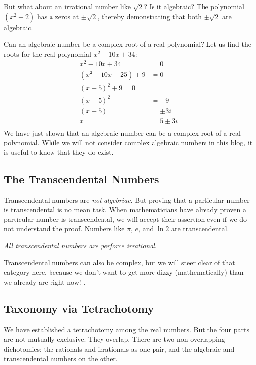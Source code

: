 \documentclass[
  a4paper,
]{article}
\begin{document}
But what about an irrational number like \(\sqrt{2}\)? Is it algebraic?
The polynomial \((x^2 - 2)\) has a zeros at \(\pm\sqrt{2}\), thereby
demonstrating that both \(\pm\sqrt{2}\) are algebraic.

Can an algebraic number be a complex root of a real polynomial? Let us
find the roots for the real polynomial \(x^2 - 10x +34\): \[
\begin{aligned}
x^2 - 10x + 34 &= 0\\
(x^2 -10x + 25) + 9 &= 0\\
(x - 5)^2 + 9 = 0\\
(x - 5)^2 &= -9\\
(x - 5) &= \pm3i\\
x &= 5 \pm 3i\\
\end{aligned}
\] We have just shown that an algebraic number can be a complex root of
a real polynomial. While we will not consider complex algebraic numbers
in this blog, it is useful to know that they do exist.

\subsection{The Transcendental
Numbers}\label{the-transcendental-numbers}

Transcendental numbers are \emph{not algebriac}. But proving that a
particular number is transcendental is no mean task. When mathematicians
have already proven a particular number is transcendental, we will
accept their assertion even if we do not understand the proof. Numbers
like
\href{https://www.wolframalpha.com/input?i=is+pi+transcendental}{\(\pi\)},
\href{https://www.wolframalpha.com/input?i=is+e+transcendental}{\(e\)},
and
\href{https://www.wolframalpha.com/input?i=is+ln\%282\%29+transcendental}{\(\ln 2\)}
are transcendental.

\emph{All transcendental numbers are perforce irrational}.

Transcendental numbers can also be complex, but we will steer clear of
that category here, because we don't want to get more dizzy
(mathematically) than we already are right now! 
\normalfont.

\subsection{Taxonomy via Tetrachotomy}\label{taxonomy-via-tetrachotomy}

We have established a
\href{https://www.collinsdictionary.com/dictionary/english/tetrachotomy}{tetrachotomy}
among the real numbers. But the four parts are not mutually exclusive.
They overlap. There are two non-overlapping dichotomies: the rationals
and irrationals as one pair, and the algebraic and transcendental
numbers on the other.
\end{document}
